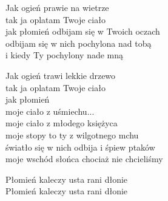 \begin{text}
    Jak ogień prawie na wietrze\\
    tak ja oplatam Twoje ciało\\
    jak płomień odbijam się w Twoich oczach\\
    odbijam się w nich pochylona nad tobą\\
    i kiedy Ty pochylony nade mną

    Jak ogień trawi lekkie drzewo\\
    tak ja oplatam Twoje ciało\\
    jak płomień\\
    moje ciało z uśmiechu...\\
    moje ciało z młodego księżyca\\
    moje stopy to ty z wilgotnego mchu\\
    światło się w nich odbija i śpiew ptaków\\
    moje wschód słońca chociaż nie chcieliśmy

    Płomień kaleczy usta rani dłonie\\
    Płomień kaleczy usta rani dłonie
\end{text}
\begin{chord}

\end{chord}